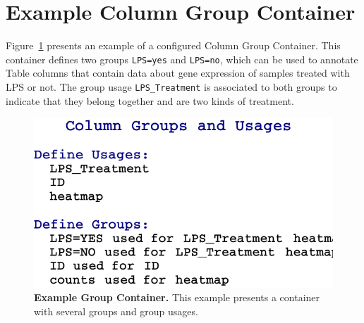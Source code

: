 \section{Example Column Group Container}
Figure~\ref{fig:ExampleGroupContainer} presents an example of a configured Column Group Container. This container defines two groups \texttt{LPS=yes} and \texttt{LPS=no}, which can be used to annotate Table columns that contain data about gene expression of samples treated with LPS or not.  The group usage \texttt{LPS\_Treatment} is associated to both groups to indicate that they belong together and are two kinds of treatment.

\begin{figure}
  \centering
  \includegraphics[width=\figWidthNarrow]{figures/ExampleGroupContainer.pdf}
\caption[Example Group Container.]{\textbf{Example Group Container.} This example presents a container with several groups and group usages.}
\label{fig:ExampleGroupContainer}
\end{figure}
